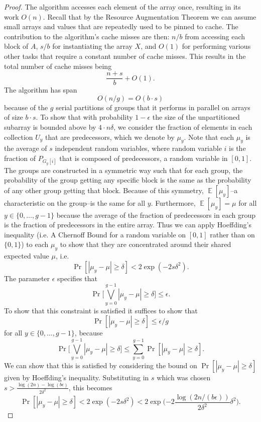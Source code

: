 \documentclass[sigconf]{acmart}
\def\E{\operatorname{\mathbb{E}}}
\theoremstyle{remark}
\theoremstyle{remark}
\begin{document}
\begin{proof}
	The algorithm accesses each element of the array once, resulting in its work $O(n)$.
	Recall that by the Resource Augmentation Theorem we can assume small arrays and values that are repeatedly used to be pinned to cache.
	The contribution to the algorithm's cache misses are then:
	$n/b$ from accessing each block of $A$, $s/b$ for instantiating the array $X$, and $O(1)$ for performing various other tasks that require a constant number of cache misses. 
	This results in the total number of cache misses being $$\frac{n+s}{b}+O(1).$$
	The algorithm has span $$O(n/g) = O(b\cdot s) $$
	because of the $g$ serial partitions of groups that it performs in parallel on arrays of size $b\cdot s$.
	To show that with probability $1-\epsilon$ the size of the unpartitioned subarray is bounded above by $4\cdot n\delta$, we consider the fraction of elements in each collection $U_y$ that are predecessors, which we denote by $\mu_y$.
	Note that each $\mu_y$ is the average of $s$ independent random variables, where random variable $i$ is the fraction of $P_{G_y[i]}$ that is composed of predecessors, a random variable in $[0, 1]$.
	The groups are constructed in a symmetric way such that for each group, the probability of the group getting any specific block is the same as the probability of any other group getting that block. 
	Because of this symmetry, $\E[\mu_y]$--a characteristic on the group--is the same for all $y$.
	Furthermore, $\E[\mu_y] = \mu$ for all $y \in \{0,\ldots,g-1\}$ because the average of the fraction of predecessors in each group is the fraction of predecessors in the entire array.	
	Thus we can apply Hoeffding's inequality (i.e. A Chernoff Bound for a random variable on $[0,1]$ rather than on $\{0,1\}$) to each $\mu_y$ to show that they are concentrated around their shared expected value $\mu$, i.e.
	$$\Pr[|\mu_y - \mu| \geq \delta] < 2\exp(-2s\delta^2). $$
	The parameter $\epsilon$ specifies that 
	$$\Pr\Big[\bigvee_{y=0}^{g-1} |\mu_y - \mu| \geq \delta\Big] \leq \epsilon.$$
	To show that this constraint is satisfied it suffices to show that 
	$$\Pr[|\mu_y - \mu| \geq \delta] \leq \epsilon/g $$ for all $y\in \{0,\ldots,g-1\}$, because
	$$\Pr\Big[\bigvee_{y=0}^{g-1} |\mu_y - \mu| \geq \delta\Big] \leq \sum_{y=0}^{g-1} \Pr[|\mu_y - \mu| \geq \delta].$$
	We can show that this is satisfied by considering the bound on $\Pr[|\mu_y - \mu| \geq \delta]$ given by Hoeffding's inequality. 
	Substituting in $s$ which was chosen $s > \frac{\log (2n) -\log (b\epsilon)}{2\delta^2}$, this becomes
	$$\Pr[|\mu_y - \mu| \geq \delta] < 2\exp(-2s\delta^2) < 2\exp\Big({-2} \frac{\log (2n/(b\epsilon))}{2\delta^2} \delta^2\Big). $$

\end{proof}
\end{document}
